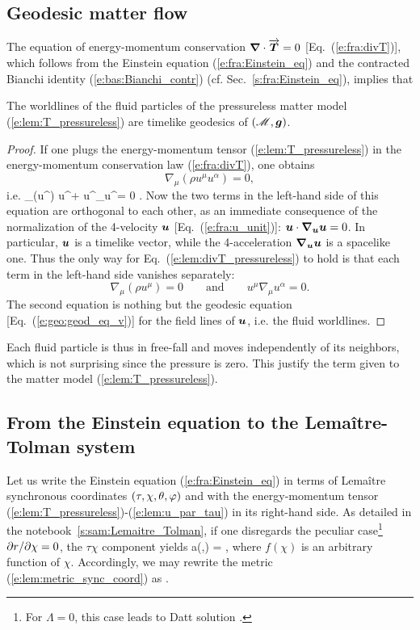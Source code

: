 \subsection{Geodesic matter flow}

The equation of energy-momentum conservation $\bm{\nabla}\cdot\overrightarrow{\bm{T}} = 0$
[Eq.~(\ref{e:fra:divT})], which
follows from the Einstein equation (\ref{e:fra:Einstein_eq}) and the contracted
Bianchi identity (\ref{e:bas:Bianchi_contr}) (cf. Sec.~\ref{s:fra:Einstein_eq}),
implies that
\begin{greybox}
The worldlines of the fluid particles of the pressureless matter
model (\ref{e:lem:T_pressureless}) are timelike geodesics of
$(\mathscr{M},\bm{g})$.
\end{greybox}
\begin{proof}
If one plugs the energy-momentum tensor (\ref{e:lem:T_pressureless}) in the
energy-momentum conservation law (\ref{e:fra:divT}), one obtains
\[
    \nabla_\mu (\rho u^\mu u^\alpha )  = 0 ,
\]
i.e.
\be \label{e:lem:divT_pressureless}
    \nabla_\mu (\rho u^\mu) u^\alpha + \rho u^\mu \nabla_\mu u^\alpha = 0 .
\ee
Now the two terms in the left-hand side of this equation are orthogonal
to each other, as an immediate consequence of the normalization of the
4-velocity $\bm{u}$ [Eq.~(\ref{e:fra:u_unit})]:
$\bm{u}\cdot \bm{\nabla}_{\bm{u}}\bm{u} = 0$. In particular, $\bm{u}$
is a timelike vector, while the 4-acceleration $\bm{\nabla}_{\bm{u}}\bm{u}$
is a spacelike one. Thus the only way for Eq.~(\ref{e:lem:divT_pressureless})
to hold is  that each term
in the left-hand side vanishes separately:
\[
    \nabla_\mu (\rho u^\mu) = 0 \qquad\mbox{and}\qquad u^\mu \nabla_\mu u^\alpha = 0 .
\]
The second equation is nothing but the geodesic equation [Eq.~(\ref{e:geo:geod_eq_v})]
for the field lines of $\bm{u}$, i.e. the fluid worldlines.
\end{proof}
Each fluid particle is thus in free-fall and moves independently of its
neighbors, which is not surprising since the pressure is zero.
This justify the term  given to the matter
model (\ref{e:lem:T_pressureless}).

\subsection{From the Einstein equation to the Lemaître-Tolman system}

Let us write the Einstein equation (\ref{e:fra:Einstein_eq})
in terms of Lemaître synchronous coordinates $(\tau,\chi,\theta,\varphi)$
and with the energy-momentum tensor (\ref{e:lem:T_pressureless})-(\ref{e:lem:u_par_tau})
in its right-hand side.
As detailed in the notebook~\ref{s:sam:Lemaitre_Tolman},
if one disregards the peculiar case\footnote{For $\Lambda=0$, this case leads to
Datt solution \cite{Datt38}.} ${\partial r}/{\partial \chi} = 0$,
the $\tau\chi$ component yields
\be \label{e:lem:a_f_dr}
    a(\tau,\chi) =   ,
\ee
where $f(\chi)$ is an arbitrary function of $\chi$.
Accordingly, we may rewrite the metric (\ref{e:lem:metric_sync_coord}) as
\be \label{e:lem:metric_Lemaitre}
     .
\ee


